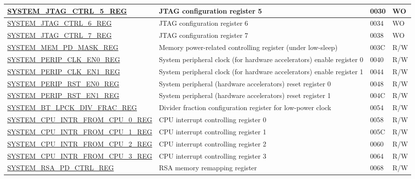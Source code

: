 \begin{longtable}{ | p{6.5cm} | p{7.5cm} | p{1.3cm} | p{1cm} | }
\hyperref[regdesc:SYSTEMJTAGCTRL5REG]{SYSTEM\_JTAG\_CTRL\_5\_REG} & JTAG configuration register 5 & \hexprefix{}0030 & WO \\ \hline
\hyperref[regdesc:SYSTEMJTAGCTRL6REG]{SYSTEM\_JTAG\_CTRL\_6\_REG} & JTAG configuration register 6 & \hexprefix{}0034 & WO \\ \hline
\hyperref[regdesc:SYSTEMJTAGCTRL7REG]{SYSTEM\_JTAG\_CTRL\_7\_REG} & JTAG configuration register 7 & \hexprefix{}0038 & WO \\ \hline
\hyperref[regdesc:SYSTEMMEMPDMASKREG]{SYSTEM\_MEM\_PD\_MASK\_REG} & Memory power-related controlling register (under low-sleep) & \hexprefix{}003C & R/W \\ \hline
\hyperref[regdesc:SYSTEMPERIPCLKEN0REG]{SYSTEM\_PERIP\_CLK\_EN0\_REG} & System peripheral clock (for hardware accelerators) enable register 0 & \hexprefix{}0040 & R/W \\ \hline
\hyperref[regdesc:SYSTEMPERIPCLKEN1REG]{SYSTEM\_PERIP\_CLK\_EN1\_REG} & System peripheral clock  (for hardware accelerators) enable register 1 & \hexprefix{}0044 & R/W \\ \hline
\hyperref[regdesc:SYSTEMPERIPRSTEN0REG]{SYSTEM\_PERIP\_RST\_EN0\_REG} & System peripheral (hardware accelerators) reset register 0 & \hexprefix{}0048 & R/W \\ \hline
\hyperref[regdesc:SYSTEMPERIPRSTEN1REG]{SYSTEM\_PERIP\_RST\_EN1\_REG} & System peripheral (hardware accelerators) reset register 1 & \hexprefix{}004C & R/W \\ \hline
\hyperref[regdesc:SYSTEMBTLPCKDIVFRACREG]{SYSTEM\_BT\_LPCK\_DIV\_FRAC\_REG} & Divider fraction configuration register for low-power clock & \hexprefix{}0054 & R/W \\ \hline
\hyperref[regdesc:SYSTEMCPUINTRFROMCPU0REG]{SYSTEM\_CPU\_INTR\_FROM\_CPU\_0\_REG} & CPU interrupt controlling register 0 & \hexprefix{}0058 & R/W \\ \hline
\hyperref[regdesc:SYSTEMCPUINTRFROMCPU1REG]{SYSTEM\_CPU\_INTR\_FROM\_CPU\_1\_REG} & CPU interrupt controlling register 1 & \hexprefix{}005C & R/W \\ \hline
\hyperref[regdesc:SYSTEMCPUINTRFROMCPU2REG]{SYSTEM\_CPU\_INTR\_FROM\_CPU\_2\_REG} & CPU interrupt controlling register 2 & \hexprefix{}0060 & R/W \\ \hline
\hyperref[regdesc:SYSTEMCPUINTRFROMCPU3REG]{SYSTEM\_CPU\_INTR\_FROM\_CPU\_3\_REG} & CPU interrupt controlling register 3 & \hexprefix{}0064 & R/W \\ \hline
\hyperref[regdesc:SYSTEMRSAPDCTRLREG]{SYSTEM\_RSA\_PD\_CTRL\_REG} & RSA memory remapping register & \hexprefix{}0068 & R/W \\ \hline

\end{longtable}
